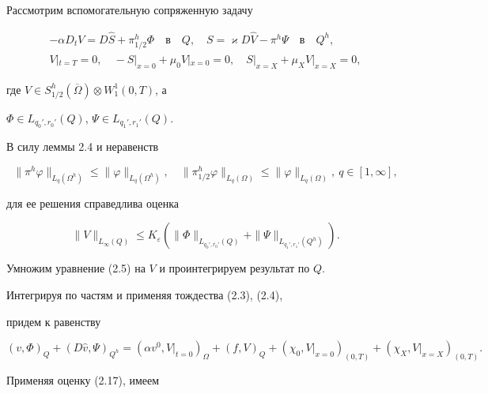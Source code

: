 \documentclass[12pt]{article}
\theoremstyle{plain} %
\theoremstyle{definition}
\numberwithin{equation}{section}
\begin{document}
\begin{pf} Рассмотрим вспомогательную сопряженную задачу


\begin{gather*}


-\alpha D_tV=D\widehat S +\pi^h_{1/2}\Phi\quad\text{в}\quad Q,\quad


S=\varkappa D\widehat V -\pi^h\Psi\quad\text{в}\quad Q^h,\\


%


V|_{t=T}=0,\quad -S|_{x=0}+\mu_0 V|_{x=0}=0,\quad


S|_{x=X}+\mu_X V|_{x=X}=0,


\end{gather*}


где $V\in S^h_{1/2}(\overline\Omega)\otimes W^1_1(0,T)$, а


$\Phi\in L_{q_0',r_0'}(Q)$, $\Psi\in L_{q_1',r_1'}(Q)$.


В силу леммы 2.4 и неравенств


$$


\|\pi^h \varphi\|_{L_q(\Omega^h)}\le \|\varphi\|_{L_q(\Omega^h)},\quad


\|\pi^h_{1/2} \varphi\|_{L_q(\Omega)}\le \|\varphi\|_{L_q(\Omega)},\


q\in [1,\infty],


$$


для ее решения справедлива оценка


\begin{equation}


\|V\|_{L_\infty(Q)}\le K_\varepsilon


(\|\Phi\|_{L_{q_0',r_0'}(Q)}+\|\Psi\|_{L_{q_1',r_1'}(Q^h)}).


\end{equation}


Умножим уравнение (2.5) на $V$ и проинтегрируем результат по $Q$.


Интегрируя по частям и применяя тождества (2.3), (2.4),


придем к равенству


$$


(v,\Phi)_Q+(D\widehat v,\Psi)_{Q^h}=


(\alpha v^0,V|_{t=0})_\Omega+


(f,V)_Q+(\chi_0,V|_{x=0})_{(0,T)}+(\chi_X,V|_{x=X})_{(0,T)}.


$$


Применяя оценку (2.17), имеем


\begin{multline*}



\end{multline*}
\end{pf}
\end{document}
